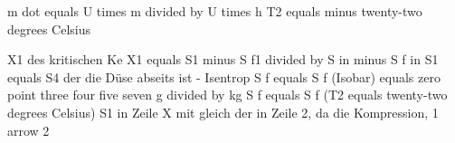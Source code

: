 m dot equals U times m divided by U times h  
T2 equals minus twenty-two degrees Celsius  

X1 des kritischen Ke  
X1 equals S1 minus S f1 divided by S in minus S f in  
S1 equals S4 der die Düse abseits ist - Isentrop  
S f equals S f (Isobar) equals zero point three four five seven g divided by kg  
S f equals S f (T2 equals twenty-two degrees Celsius)  
S1 in Zeile X mit gleich der in Zeile 2, da die Kompression, 1 arrow 2